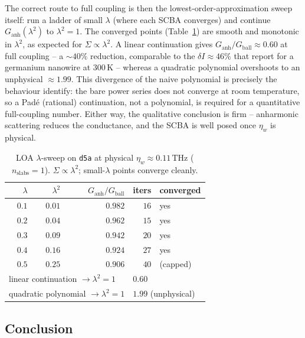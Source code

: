 The correct route to full coupling is then the lowest-order-approximation sweep itself: run a
ladder of small $\lambda$ (where each SCBA converges) and continue $G_\text{anh}(\lambda^2)$ to
$\lambda^2=1$. The converged points (Table~\ref{tab:diag_loa}) are smooth and monotonic in
$\lambda^2$, as expected for $\Sigma\propto\lambda^2$. A linear continuation gives
$G_\text{anh}/G_\text{ball}\approx0.60$ at full coupling -- a $\sim40\%$ reduction, comparable
to the $\delta I\approx46\%$ that \citet{lee_anharmonic_2018} report for a germanium nanowire
at $300\,\mathrm{K}$ -- whereas a quadratic polynomial overshoots to an unphysical
$\approx1.99$. This divergence of the naive polynomial is precisely the behaviour
\citet{bescond_LOA_pade_2011} identify: the bare power series does not converge at room
temperature, so a Pad\'e (rational) continuation, not a polynomial, is required for a
quantitative full-coupling number. Either way, the qualitative conclusion is firm -- anharmonic
scattering reduces the conductance, and the SCBA is well posed once $\eta_w$ is physical.

\begin{table}[t]
  \centering
  \caption{LOA $\lambda$-sweep on \texttt{d5a} at physical $\eta_w\approx0.11\,\mathrm{THz}$
    ($n_\text{slabs}=1$). $\Sigma\propto\lambda^2$; small-$\lambda$ points converge cleanly.}
  \label{tab:diag_loa}
  \begin{tabular}{rrrrl}
    \toprule
    $\lambda$ & $\lambda^2$ & $G_\text{anh}/G_\text{ball}$ & iters & converged\\
    \midrule
    $0.1$ & $0.01$ & $0.982$ & $16$ & yes\\
    $0.2$ & $0.04$ & $0.962$ & $15$ & yes\\
    $0.3$ & $0.09$ & $0.942$ & $20$ & yes\\
    $0.4$ & $0.16$ & $0.924$ & $27$ & yes\\
    $0.5$ & $0.25$ & $0.906$ & $40$ & (capped)\\
    \midrule
    \multicolumn{3}{l}{linear continuation $\to\lambda^2{=}1$} & \multicolumn{2}{l}{$0.60$}\\
    \multicolumn{3}{l}{quadratic polynomial $\to\lambda^2{=}1$} & \multicolumn{2}{l}{$1.99$ (unphysical)}\\
    \bottomrule
  \end{tabular}
\end{table}

\subsection{Conclusion}
\label{sec:diag_conclusion}


